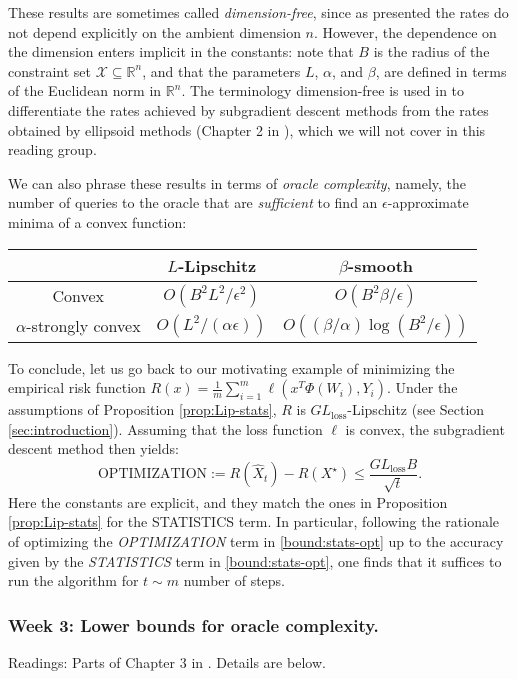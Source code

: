 These results are sometimes called \emph{dimension-free}, since as presented the rates do not depend explicitly on the ambient dimension $n$. However, the dependence on the dimension enters implicit in the constants: note that $B$ is the radius of the constraint set $\mathcal{X}\subseteq \mathbb{R}^n$, and that the parameters $L$, $\alpha$, and $\beta$, are defined in terms of the Euclidean norm in $\mathbb{R}^n$. The terminology dimension-free is used in \cite{bubeck} to differentiate the rates achieved by subgradient descent methods from the rates obtained by ellipsoid methods (Chapter 2 in \cite{bubeck}), which we will not cover in this reading group.
	
We can also phrase these results in terms of \emph{oracle complexity}, namely, the number of queries to the oracle that are \emph{sufficient} to find an $\epsilon$-approximate minima of a convex function:
\begin{center}
 \begin{tabular}{|c | c | c|}
 \hline
 & $L$-Lipschitz & $\beta$-smooth\\
 \hline
 Convex & $O(B^2L^2/\epsilon^2)$ & $O(B^2\beta/\epsilon)$\\
 \hline
 $\alpha$-strongly convex & $O(L^2/(\alpha \epsilon))$ & $O((\beta/\alpha)\log{(B^2/\epsilon)})$\\
 \hline
\end{tabular}
\end{center}

	
\begin{remark}\label{rem:optimization}
To conclude, let us go back to our motivating example of minimizing the empirical risk function $R(x) = \frac{1}{m}\sum_{i=1}^m \ell(x^T\Phi(W_i),Y_i)$. Under the assumptions of Proposition \ref{prop:Lip-stats}, $R$ is $GL_\textrm{loss}$-Lipschitz (see Section \ref{sec:introduction}). Assuming that the loss function $\ell$ is convex, the subgradient descent method then yields:
$$
	\textrm{OPTIMIZATION} := R(\hat X_t) - R(X^\star) \le \frac{GL_\textrm{loss}B}{\sqrt{t}}.
$$
Here the constants are explicit, and they match the ones in Proposition \ref{prop:Lip-stats} for the \textrm{STATISTICS} term. In particular, following the rationale of optimizing the \emph{OPTIMIZATION} term in \eqref{bound:stats-opt} up to the accuracy given by the \emph{STATISTICS} term in \eqref{bound:stats-opt}, one finds that it suffices to run the algorithm for $t\sim m$ number of steps.
\end{remark}

\subsubsection*{Week 3: Lower bounds for oracle complexity.}
Readings: Parts of Chapter 3 in \cite{bubeck}. Details are below.\\

